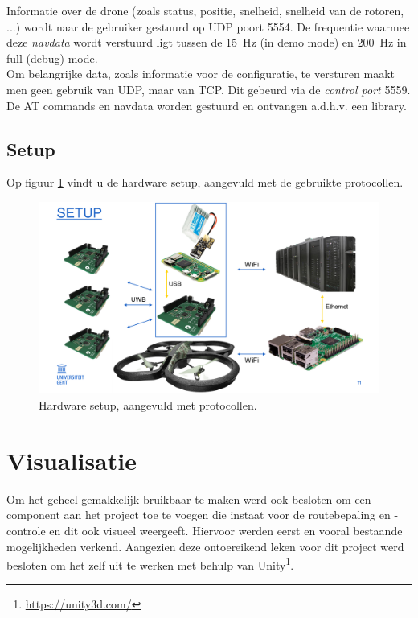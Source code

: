 Informatie over de drone (zoals status, positie, snelheid, snelheid van de rotoren, ...) wordt naar de gebruiker gestuurd op UDP poort 5554.
De frequentie waarmee deze \textit{navdata} wordt verstuurd ligt tussen de \SI{15}{\Hz} (in demo mode) en \SI{200}{\Hz} in full (debug) mode.\\
Om belangrijke data, zoals informatie voor de configuratie, te versturen maakt men geen gebruik van UDP, maar van TCP.
Dit gebeurd via de \textit{control port} 5559. \cite{developer_guide2012}\\
De AT commands en navdata worden gestuurd en ontvangen a.d.h.v. een library.

\subsection{Setup} \label{sec:setup}
Op figuur \ref{fig:setup} vindt u de hardware setup, aangevuld met de gebruikte protocollen.
\begin{figure}[p]
	\centering
	\includegraphics[width=\textwidth]{Setup}
	\caption[Setup]{Hardware setup, aangevuld met protocollen.}
	\label{fig:setup}
\end{figure}

\section{Visualisatie} \label{sec:visualization}
Om het geheel gemakkelijk bruikbaar te maken werd ook besloten om een component aan het project toe te voegen die instaat voor de routebepaling en -controle en dit ook visueel weergeeft. Hiervoor werden eerst en vooral bestaande mogelijkheden verkend. Aangezien deze ontoereikend leken voor dit project werd besloten om het zelf uit te werken met behulp van Unity\footnote{\url{https://unity3d.com/}}.

